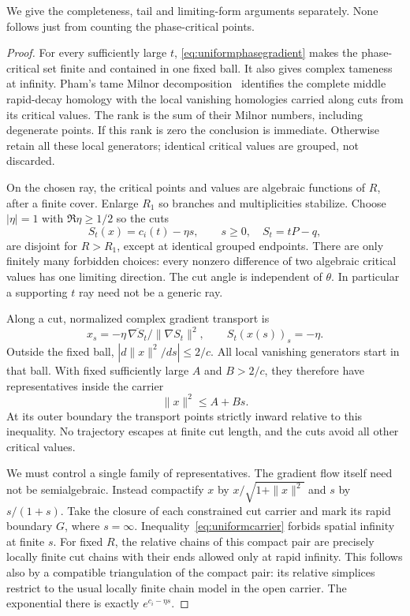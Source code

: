 \documentclass[11pt]{article}
\theoremstyle{definition}\newtheorem{definition}[theorem]{Definition}
\theoremstyle{remark}\newtheorem{remark}[theorem]{Remark}
\begin{document}
We give the completeness, tail and limiting-form arguments separately.
None follows just from counting the phase-critical points.

\begin{proof}
For every sufficiently large $t$, \eqref{eq:uniformphasegradient}
makes the phase-critical set finite and contained in one fixed
ball. It also gives complex tameness at infinity. Pham's tame
Milnor decomposition~\cite[Part~I and Appendix]{Pham} identifies
the complete middle rapid-decay homology with the local vanishing
homologies carried along cuts from its critical values. The rank
is the sum of their Milnor numbers, including degenerate points.
If this rank is zero the conclusion is immediate. Otherwise
retain all these local generators; identical critical values
are grouped, not discarded.

On the chosen ray, the critical points and values are algebraic
functions of $R$, after a finite cover. Enlarge $R_1$ so branches
and multiplicities stabilize. Choose $|\eta|=1$ with
$\Re\eta\ge1/2$ so the cuts
\[
 S_t(x)=c_i(t)-\eta s,\qquad s\ge0,\quad S_t=tP-q,
\]
are disjoint for $R>R_1$, except at identical grouped endpoints.
There are only finitely many forbidden choices: every nonzero
difference of two algebraic critical values has one limiting
direction. The cut angle is independent of $\theta$. In
particular a supporting $t$ ray need not be a generic ray.

Along a cut, normalized complex gradient transport is
\[
 x_s=-\eta\,\overline{\nabla S_t}/\|\nabla S_t\|^2,
               \qquad S_t(x(s))_s=-\eta.
\]
Outside the fixed ball,
$|d\|x\|^2/ds|\le2/c$. All local vanishing generators start
in that ball. With fixed sufficiently large $A$ and $B>2/c$,
they therefore have representatives inside the carrier
\begin{equation}\label{eq:uniformcarrier}
 \|x\|^2\le A+Bs.
\end{equation}
At its outer boundary the transport points strictly inward
relative to this inequality. No trajectory escapes at finite
cut length, and the cuts avoid all other critical values.

We must control a single family of representatives. The gradient
flow itself need not be semialgebraic. Instead compactify $x$
by $x/\sqrt{1+\|x\|^2}$ and $s$ by $s/(1+s)$. Take the closure
of each constrained cut carrier and mark its rapid boundary
$G$, where $s=\infty$. Inequality~\eqref{eq:uniformcarrier}
forbids spatial infinity at finite $s$. For fixed $R$, the
relative chains of this compact pair are precisely locally
finite cut chains with their ends allowed only at rapid
infinity. This follows also by a compatible triangulation of
the compact pair: its relative simplices restrict to the usual
locally finite chain model in the open carrier. The exponential
there is exactly $e^{c_i-\eta s}$.


\end{proof}
\end{document}
